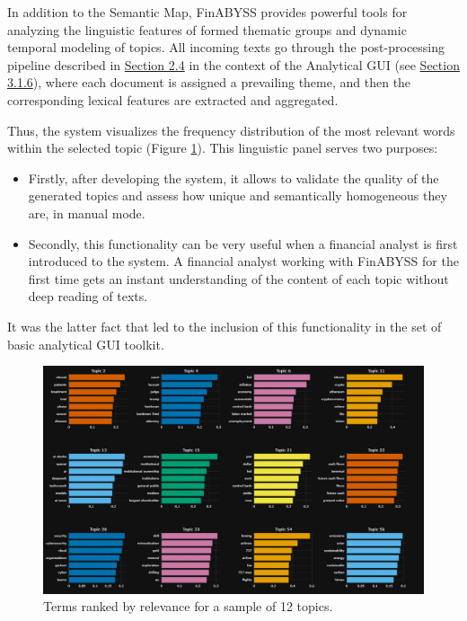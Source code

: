 In addition to the Semantic Map, FinABYSS provides powerful tools for analyzing the linguistic features
of formed thematic groups and dynamic temporal modeling of topics. All incoming texts go through
the post-processing pipeline described in \hyperref[sec:sys_dev]{Section 2.4} in the context of the Analytical GUI
(see \hyperref[sec:gui]{Section 3.1.6}), where each document is assigned a prevailing theme, and
then the corresponding lexical features are extracted and aggregated.

Thus, the system visualizes the frequency distribution of the most relevant words within the selected topic
(Figure \ref{fig:topics_words_freqs}). This linguistic panel serves two purposes:

\begin{itemize}
    \item Firstly, after developing the system, it allows to validate the quality of the generated topics
    and assess how unique and semantically homogeneous they are, in manual mode.
    \item Secondly, this functionality can be very useful when a financial analyst is first introduced
    to the system. A financial analyst working with FinABYSS for the first time gets an instant understanding
    of the content of each topic without deep reading of texts.
\end{itemize}

It was the latter fact that led to the inclusion of this functionality in the set of basic analytical GUI toolkit.

\begin{figure}[H]
    \centering
    \includegraphics[width=1\linewidth]{img/topics_words_freqs.png}
    \caption{Terms ranked by relevance for a sample of 12 topics.}
    \label{fig:topics_words_freqs}
\end{figure}

